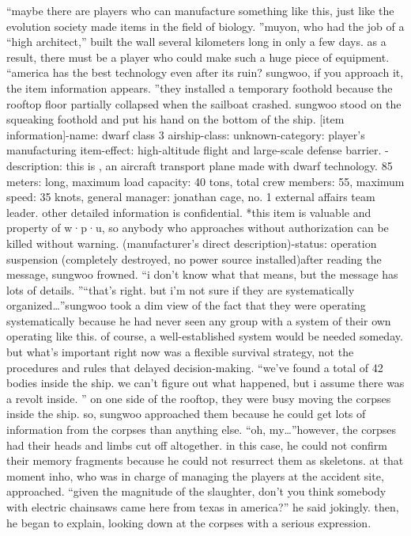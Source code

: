 “maybe there are players who can manufacture something like this, just like the evolution society made items in the field of biology.
”muyon, who had the job of a “high architect,” built the wall several kilometers long in only a few days.
 as a result, there must be a player who could make such a huge piece of equipment.
“america has the best technology even after its ruin? sungwoo, if you approach it, the item information appears.
”they installed a temporary foothold because the rooftop floor partially collapsed when the sailboat crashed.
 sungwoo stood on the squeaking foothold and put his hand on the bottom of the ship.
[item information]-name: dwarf class 3 airship-class: unknown-category: player’s manufacturing item-effect: high-altitude flight and large-scale defense barrier.
-description: this is , an aircraft transport plane made with dwarf technology.
 85 meters: long, maximum load capacity: 40 tons, total crew members: 55, maximum speed: 35 knots, general manager: jonathan cage, no.
 1 external affairs team leader.
 other detailed information is confidential.
*this item is valuable and property of w·p·u, so anybody who approaches without authorization can be killed without warning.
 (manufacturer’s direct description)-status: operation suspension (completely destroyed, no power source installed)after reading the message, sungwoo frowned.
“i don’t know what that means, but the message has lots of details.
”“that’s right.
 but i’m not sure if they are systematically organized…”sungwoo took a dim view of the fact that they were operating systematically because he had never seen any group with a system of their own operating like this.
of course, a well-established system would be needed someday.
 but what’s important right now was a flexible survival strategy, not the procedures and rules that delayed decision-making.
“we’ve found a total of 42 bodies inside the ship.
 we can’t figure out what happened, but i assume there was a revolt inside.
”
on one side of the rooftop, they were busy moving the corpses inside the ship.
 so, sungwoo approached them because he could get lots of information from the corpses than anything else.
“oh, my…”however, the corpses had their heads and limbs cut off altogether.
in this case, he could not confirm their memory fragments because he could not resurrect them as skeletons.
at that moment inho, who was in charge of managing the players at the accident site, approached.
“given the magnitude of the slaughter, don’t you think somebody with electric chainsaws came here from texas in america?” he said jokingly.
then, he began to explain, looking down at the corpses with a serious expression.
